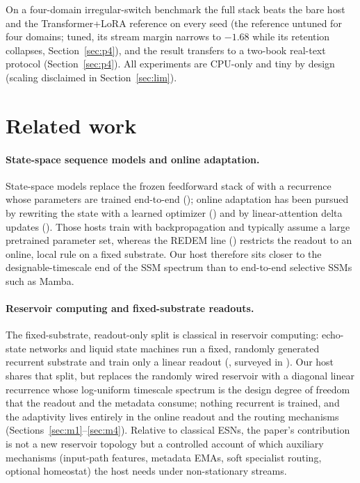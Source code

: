 \documentclass[preprint,12pt]{elsarticle}
\begin{document}
On a four-domain irregular-switch benchmark the full stack beats the
bare host and the Transformer+LoRA reference on every seed (the
reference untuned for four domains; tuned, its stream margin narrows
to $-1.68$ while its retention collapses, Section~\ref{sec:p4}), and
the result transfers to a two-book real-text protocol
(Section~\ref{sec:p4}). All experiments are CPU-only and tiny by
design (scaling disclaimed in Section~\ref{sec:lim}).

\section{Related work}
\label{sec:related}

\paragraph{State-space sequence models and online adaptation.}
State-space models replace the frozen feedforward stack of
\cite{vaswani2017} with a recurrence whose parameters are trained
end-to-end (\cite{gu2022s4,gu2023mamba,liu2025longhorn,behrouz2025titans});
online adaptation has been pursued by rewriting the state with a learned
optimizer (\cite{sun2024ttt}) and by linear-attention delta updates
(\cite{yang2024deltanet}). Those hosts train with backpropagation and
typically assume a large pretrained parameter set, whereas the REDEM
line (\cite{redema,redemb,redemc}) restricts the readout to an online,
local rule on a fixed substrate. Our host therefore sits closer to the
designable-timescale end of the SSM spectrum than to end-to-end
selective SSMs such as Mamba.

\paragraph{Reservoir computing and fixed-substrate readouts.}
The fixed-substrate, readout-only split is classical in reservoir
computing: echo-state networks and liquid state machines run a fixed,
randomly generated recurrent substrate and train only a linear readout
(\cite{jaeger2001esn,jaeger2004science,maass2002lsm,verstraeten2007},
surveyed in \cite{lukosevicius2009}). Our host shares that split, but
replaces the randomly wired reservoir with a diagonal linear
recurrence whose log-uniform timescale spectrum is the design degree
of freedom that the readout and the metadata consume; nothing
recurrent is trained, and the adaptivity lives entirely in the online
readout and the routing mechanisms
(Sections~\ref{sec:m1}--\ref{sec:m4}). Relative to classical ESNs, the
paper's contribution is not a new reservoir topology but a controlled
account of which auxiliary mechanisms (input-path features, metadata
EMAs, soft specialist routing, optional homeostat) the host needs
under non-stationary streams.
\end{document}
